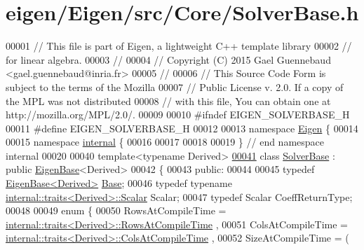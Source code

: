 \hypertarget{eigen_2_eigen_2src_2_core_2_solver_base_8h_source}{}\section{eigen/\+Eigen/src/\+Core/\+Solver\+Base.h}
\label{eigen_2_eigen_2src_2_core_2_solver_base_8h_source}

\begin{DoxyCode}
00001 \textcolor{comment}{// This file is part of Eigen, a lightweight C++ template library}
00002 \textcolor{comment}{// for linear algebra.}
00003 \textcolor{comment}{//}
00004 \textcolor{comment}{// Copyright (C) 2015 Gael Guennebaud <gael.guennebaud@inria.fr>}
00005 \textcolor{comment}{//}
00006 \textcolor{comment}{// This Source Code Form is subject to the terms of the Mozilla}
00007 \textcolor{comment}{// Public License v. 2.0. If a copy of the MPL was not distributed}
00008 \textcolor{comment}{// with this file, You can obtain one at http://mozilla.org/MPL/2.0/.}
00009 
00010 \textcolor{preprocessor}{#ifndef EIGEN\_SOLVERBASE\_H}
00011 \textcolor{preprocessor}{#define EIGEN\_SOLVERBASE\_H}
00012 
00013 \textcolor{keyword}{namespace }\hyperlink{namespace_eigen}{Eigen} \{
00014 
00015 \textcolor{keyword}{namespace }\hyperlink{namespaceinternal}{internal} \{
00016 
00017 
00018 
00019 \} \textcolor{comment}{// end namespace internal}
00020 
00040 \textcolor{keyword}{template}<\textcolor{keyword}{typename} Derived>
\hyperlink{class_eigen_1_1_solver_base}{00041} \textcolor{keyword}{class }\hyperlink{class_eigen_1_1_solver_base}{SolverBase} : \textcolor{keyword}{public} \hyperlink{group___core___module_struct_eigen_1_1_eigen_base}{EigenBase}<Derived>
00042 \{
00043   \textcolor{keyword}{public}:
00044 
00045     \textcolor{keyword}{typedef} \hyperlink{group___core___module_struct_eigen_1_1_eigen_base}{EigenBase<Derived>} \hyperlink{group___core___module_struct_eigen_1_1_eigen_base}{Base};
00046     \textcolor{keyword}{typedef} \textcolor{keyword}{typename} \hyperlink{struct_eigen_1_1internal_1_1traits}{internal::traits<Derived>::Scalar} Scalar;
00047     \textcolor{keyword}{typedef} Scalar CoeffReturnType;
00048 
00049     \textcolor{keyword}{enum} \{
00050       RowsAtCompileTime = \hyperlink{struct_eigen_1_1internal_1_1traits}{internal::traits<Derived>::RowsAtCompileTime}
      ,
00051       ColsAtCompileTime = \hyperlink{struct_eigen_1_1internal_1_1traits}{internal::traits<Derived>::ColsAtCompileTime}
      ,
00052       SizeAtCompileTime = (

\end{DoxyCode}
